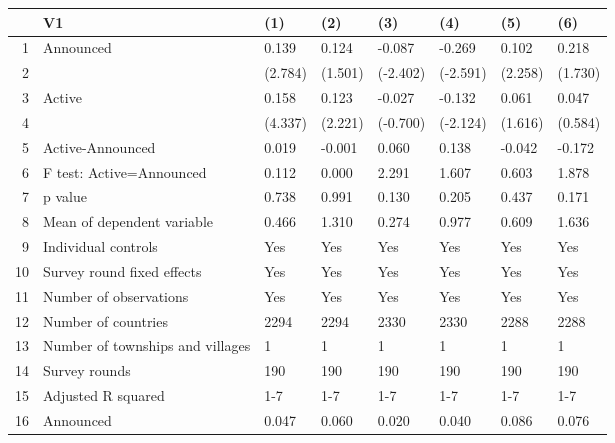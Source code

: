 \begin{table}[ht]
\centering
\begin{tabular}{rlllllll}
  \hline
 & V1 & (1) & (2) & (3) & (4) & (5) & (6) \\ 
  \hline
1 & Announced & 0.139 & 0.124 & -0.087 & -0.269 & 0.102 & 0.218 \\ 
  2 &  & (2.784) & (1.501) & (-2.402) & (-2.591) & (2.258) & (1.730) \\ 
  3 & Active & 0.158 & 0.123 & -0.027 & -0.132 & 0.061 & 0.047 \\ 
  4 &  & (4.337) & (2.221) & (-0.700) & (-2.124) & (1.616) & (0.584) \\ 
  5 & Active-Announced & 0.019 & -0.001 & 0.060 & 0.138 & -0.042 & -0.172 \\ 
  6 & F test: Active=Announced & 0.112 & 0.000 & 2.291 & 1.607 & 0.603 & 1.878 \\ 
  7 & p value & 0.738 & 0.991 & 0.130 & 0.205 & 0.437 & 0.171 \\ 
  8 & Mean of dependent variable & 0.466 & 1.310 & 0.274 & 0.977 & 0.609 & 1.636 \\ 
  9 & Individual controls & Yes & Yes & Yes & Yes & Yes & Yes \\ 
  10 & Survey round fixed effects & Yes & Yes & Yes & Yes & Yes & Yes \\ 
  11 & Number of observations & Yes & Yes & Yes & Yes & Yes & Yes \\ 
  12 & Number of countries & 2294 & 2294 & 2330 & 2330 & 2288 & 2288 \\ 
  13 & Number of townships and villages & 1 & 1 & 1 & 1 & 1 & 1 \\ 
  14 & Survey rounds & 190 & 190 & 190 & 190 & 190 & 190 \\ 
  15 & Adjusted R squared & 1-7 & 1-7 & 1-7 & 1-7 & 1-7 & 1-7 \\ 
  16 & Announced & 0.047 & 0.060 & 0.020 & 0.040 & 0.086 & 0.076 \\ 
   \hline
\end{tabular}
\end{table}
